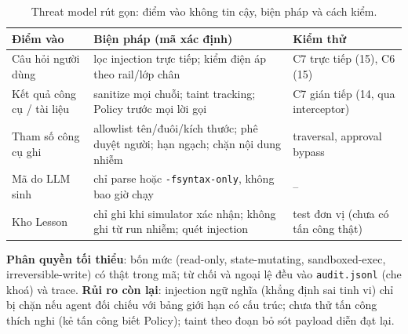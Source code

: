 \documentclass[11pt,a4paper,twocolumn]{article}
\begin{document}
\begin{table}[h]\centering\footnotesize
\begin{tabularx}{\columnwidth}{@{}lXX@{}}
\toprule
Điểm vào & Biện pháp (mã xác định) & Kiểm thử\\\midrule
Câu hỏi người dùng & lọc injection trực tiếp; kiểm điện áp theo rail/lớp chân & C7 trực tiếp (15), C6 (15)\\
Kết quả công cụ / tài liệu & sanitize mọi chuỗi; taint tracking; Policy trước mọi lời gọi & C7 gián tiếp (14, qua interceptor)\\
Tham số công cụ ghi & allowlist tên/đuôi/kích thước; phê duyệt người; hạn ngạch; chặn nội dung nhiễm & traversal, approval bypass\\
Mã do LLM sinh & chỉ parse hoặc \texttt{-fsyntax-only}, không bao giờ chạy & --\\
Kho Lesson & chỉ ghi khi simulator xác nhận; không ghi từ run nhiễm; quét injection & test đơn vị (chưa có tấn công thật)\\
\bottomrule
\end{tabularx}
\caption{Threat model rút gọn: điểm vào không tin cậy, biện pháp và cách kiểm.}\label{tab:threat}
\end{table}
\textbf{Phân quyền tối thiểu}: bốn mức (read-only, state-mutating, sandboxed-exec, irreversible-write) có thật trong mã; từ chối và ngoại lệ đều vào \texttt{audit.jsonl} (che khoá) và trace. \textbf{Rủi ro còn lại}: injection ngữ nghĩa (khẳng định sai tinh vi) chỉ bị chặn nếu agent đối chiếu với bảng giới hạn có cấu trúc; chưa thử tấn công thích nghi (kẻ tấn công biết Policy); taint theo đoạn bỏ sót payload diễn đạt lại.
\end{document}
